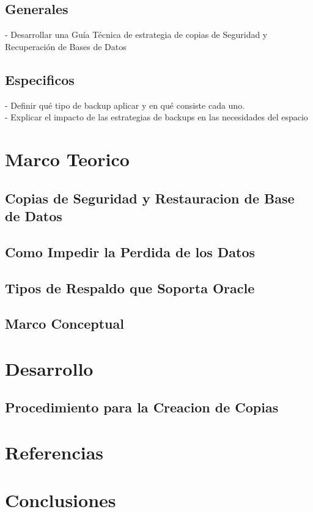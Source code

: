 \documentclass[12pt,letterpaper]{article}
\begin{document}
\subsection{Generales}
- Desarrollar una Guía Técnica de estrategia de copias de Seguridad y Recuperación de Bases de Datos
\subsection{Especificos}
- Definir qué tipo de backup aplicar y en qué consiste cada uno.\\
- Explicar el impacto de las estrategias de backups en las necesidades del espacio\\

\newpage
\section{Marco Teorico}
\subsection{Copias de Seguridad y Restauracion de Base de Datos}


\subsection{Como Impedir la Perdida de los Datos}

\subsection{Tipos de Respaldo que Soporta Oracle}
\subsection{Marco Conceptual}

\newpage

\section{Desarrollo}
\subsection{Procedimiento para la Creacion de Copias}

\newpage
\section{Referencias}
\newpage 
\section{Conclusiones} 
\end{document}

